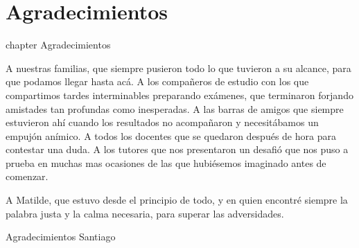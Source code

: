 \chapter*{Agradecimientos}
 {chapter} {Agradecimientos}%

A nuestras familias, que siempre pusieron todo lo que tuvieron a su alcance, para que podamos llegar hasta acá. A los compañeros de estudio con los que compartimos tardes interminables preparando exámenes, que terminaron forjando amistades tan profundas como inesperadas. A las barras de amigos que siempre estuvieron ahí cuando los resultados no acompañaron y necesitábamos un empujón anímico. A todos los docentes que se quedaron después de hora para contestar una duda. A los tutores que nos presentaron un desafió que nos puso a prueba en muchas mas ocasiones de las que hubiésemos imaginado antes de comenzar.

A Matilde, que estuvo desde el principio de todo, y en quien encontré siempre la palabra justa y la calma necesaria, para superar las adversidades.

Agradecimientos Santiago
